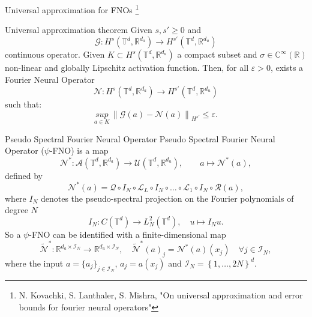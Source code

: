 \documentclass{beamer}
\newcommand{\numberset}{\mathbb}
\newcommand{\R}{\numberset{R}}
\newcommand{\C}{\numberset{C}}
\begin{document}

\begin{frame}{Universal approximation for FNOs \footnote{N. Kovachki, S. Lanthaler, S. Mishra, "On universal approximation and error bounds for fourier neural operators"}}
\begin{themedTitleBlock}{Universal approximation theorem} %
	Given $ s, s' \ge 0 $ and 
	\[ \mathcal{G}: H^s(\mathbb{T}^d, \R^{d_a}) \to H^{s'}(\mathbb{T}^d, \R^{d_u}) \]
	continuous operator. Given $ K \subset H^s(\mathbb{T}^d, \R^{d_a}) $ a compact subset and $ \sigma \in \C^{\infty}(\R) $ non-linear and globally Lipschitz activation function. Then, for all $ \varepsilon > 0 $, exists a Fourier Neural Operator
	\[ \mathcal{N}: H^s(\mathbb{T}^d, \R^{d_a}) \to H^{s'}(\mathbb{T}^d, \R^{d_u}) \]
	such that:
	\[ \underset{a \in K}{sup}\, \left\| \mathcal{G}(a) - \mathcal{N}(a) \right\|_{H^{s'}} \le \varepsilon.  \]
\end{themedTitleBlock}	
\end{frame}


\begin{frame}{Pseudo Spectral Fourier Neural Operator}
	Pseudo Spectral Fourier Neural Operator ($\psi$-FNO) is a map
	\[ \mathcal{N}^{*}: \mathcal{A}(\mathbb{T}^d, \R^{d_a}) \to \mathcal{U}(\mathbb{T}^d, \R^{d_u}), \qquad a \mapsto \mathcal{N}^{*}(a), \]
	defined by	
	\[\mathcal{N}^{*}(a) = \mathcal{Q} \circ I_N \circ \mathcal{L}_L \circ I_N \circ \dots \circ \mathcal{L}_1 \circ I_N \circ \mathcal{R}(a),	\]
	where $ I_N $ denotes the pseudo-spectral projection on the Fourier polynomials of degree $N$
	\[ I_N : C(\mathbb{T}^d) \to L^{2}_{N}(\mathbb{T}^{d}), \quad u \mapsto I_Nu. \]
	\pause
	So a $ \psi $-FNO can be identified with a finite-dimensional map 
	\[ \widetilde{\mathcal{N}}^{*}: \R^{d_a \times \mathcal{I}_N} \to \R^{d_u \times \mathcal{I}_N}, \quad \widetilde{\mathcal{N}}^{*}(a)_j = \mathcal{N}^{*}(a)(x_j) \quad \forall j \in \mathcal{I}_N, \]
	where the input $a = \{a_j\}_{j\in \mathcal{I}_N}$, $a_j = a(x_j)$ and $ \mathcal{I}_N = \left\lbrace 1, \dots, 2N \right\rbrace^d $.
\end{frame}

\end{document}
